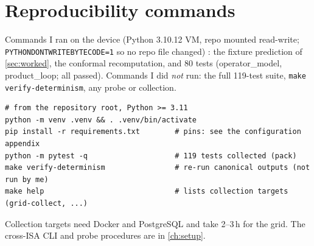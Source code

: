 \chapter{Reproducibility commands}\label{app:reproduce}
Commands I ran on the device (Python 3.10.12 VM, repo mounted read-write; \texttt{PYTHONDONTWRITEBYTECODE=1} so no repo file changed) \evRUN: the fixture prediction of \cref{sec:worked}, the conformal recomputation, and 80 tests (operator\_model, product\_loop; all passed). Commands I did \emph{not} run: the full 119-test suite, \texttt{make verify-determinism}, any probe or collection.
\begin{lstlisting}[style=cetp,language={},mathescape=false]
# from the repository root, Python >= 3.11
python -m venv .venv && . .venv/bin/activate
pip install -r requirements.txt        # pins: see the configuration appendix
python -m pytest -q                    # 119 tests collected (pack)
make verify-determinism                # re-run canonical outputs (not run by me)
make help                              # lists collection targets (grid-collect, ...)
\end{lstlisting}
Collection targets need Docker and PostgreSQL and take 2--3\,h for the grid. The cross-ISA CLI and probe procedures are in \cref{ch:setup}.
